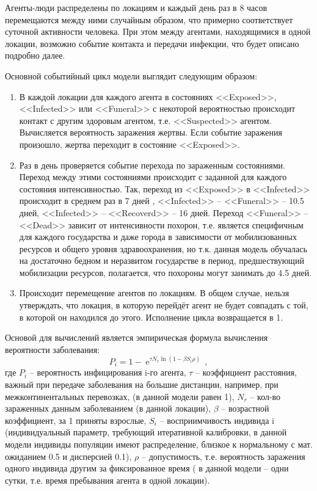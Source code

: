Агенты-люди распределены по локациям и каждый день раз в 8 часов перемещаются между ними случайным образом, что примерно соответствует суточной активности  человека. При этом между агентами, находящимися в одной локации, возможно событие контакта  и передачи инфекции, что будет описано подробно далее. 

Основной событийный цикл модели выглядит следующим образом:
\begin{enumerate}
	\item В каждой локации для каждого агента в состояниях <<Exposed>>, <<Infected>> или <<Funeral>>  с некоторой вероятностью происходит контакт с другим   здоровым агентом,  т.е. <<Suspected>> агентом. Вычисляется вероятность заражения жертвы. Если событие заражения произошло, жертва переходит в состояние <<Exposed>>.
	\item Раз в день проверяется событие перехода по зараженным состояниями. Переход между этими состояниями происходит с заданной для каждого состояния интенсивностью. Так, переход из <<Exposed>> в <<Infected>> происходит в среднем раз в 7 дней %
	\cite{ncbi:2014} ,  <<Infected>> -- <<Funeral>> -- 10.5 дней, <<Infected>> -- <<Recoverd>> -- 16 дней. Переход <<Funeral>> -- <<Dead>> зависит от интенсивности похорон,  т.е. является специфичным для каждого государства и даже города в зависимости от мобилизованных ресурсов и общего уровня здравоохранения, но  т.к. данная модель обучалась на достаточно бедном и неразвитом государстве в период, предшествующий мобилизации ресурсов, полагается, что похороны могут занимать до 4.5 дней. 
	\item Происходит перемещение агентов по локациям. В общем случае, нельзя утверждать, что локация, в которую перейдёт агент не будет совпадать с той, в которой он находился до этого. Исполнение цикла возвращается в 1. 
\end{enumerate}

Основой для вычислений является эмпирическая формула  вычисления вероятности заболевания:
\begin{equation}\label{stohastic_eq:1}
P_i = 1 - \operatorname{e}^{\tau N_r \ln(1- \beta S_i\rho)} \,,
\end{equation}
где $P_i$ -- вероятность инфицирования  i-го агента, $\tau$  -- коэффициент расстояния, важный при передаче заболевания на большие дистанции, например, при межконтинентальных перевозках, (в данной модели равен 1), $N_r$ -- кол-во зараженных данным заболеванием (в данной локации), $\beta$ -- возрастной коэффициент, за 1 приняты взрослые, $S_i$ -- восприимчивость индивида i (индивидуальный параметр, требующий итеративной калибровки, в данной модели индивиды популяции имеют распределение, близкое к нормальному с мат. ожиданием 0.5 и дисперсией 0.1), $\rho$ -- допустимость,  т.е. вероятность заражения одного индивида другим за фиксированное время ( в данной модели -- одни сутки,  т.е. время пребывания агента в одной локации).


